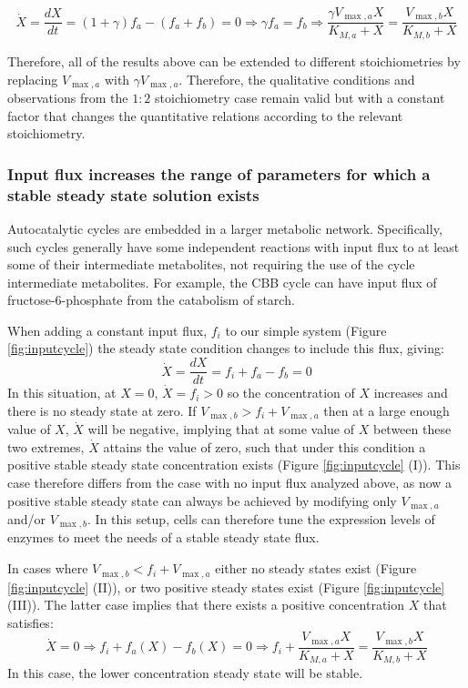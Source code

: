     \begin{equation*}
      \dot X = \frac{dX}{dt} = (1+\gamma)f_a - (f_a + f_b) = 0 \Rightarrow \gamma f_a = f_b \Rightarrow \frac{\gamma V_{\max,a}X}{K_{M,a}+X}=\frac{V_{\max,b}X}{K_{M,b}+X}
    \end{equation*}

    Therefore, all of the results above can be extended to different stoichiometries by replacing $V_{\max,a}$ with $\gamma V_{\max,a}$.
    Therefore, the qualitative conditions and observations from the $1:2$ stoichiometry case remain valid but with a constant factor that changes the quantitative relations according to the relevant stoichiometry.
\subsubsection{Input flux increases the range of parameters for which a stable steady state solution exists}
    Autocatalytic cycles are embedded in a larger metabolic network.
    Specifically, such cycles generally have some independent reactions with input flux to at least some of their intermediate metabolites, not requiring the use of the cycle intermediate metabolites.
    For example, the CBB cycle can have input flux of fructose-6-phosphate from the catabolism of starch.

    When adding a constant input flux, $f_i$ to our simple system (Figure \ref{fig:inputcycle}) the steady state condition changes to include this flux, giving:
    \begin{equation*}
      \dot X = \frac{dX}{dt} = f_i + f_a - f_b = 0
    \end{equation*}
    In this situation, at $X=0$, $\dot X=f_i>0$ so the concentration of $X$ increases and there is no steady state at zero.
    If $V_{\max,b}>f_i+V_{\max,a}$ then at a large enough value of $X$, $\dot X$ will be negative, implying that at some value of $X$ between these two extremes, $\dot{X}$ attains the value of zero, such that under this condition a positive stable steady state concentration exists (Figure \ref{fig:inputcycle} (I)).
    This case therefore differs from the case with no input flux analyzed above, as now a positive stable steady state can always be achieved by modifying only $V_{\max,a}$ and/or $V_{\max,b}$.
    In this setup, cells can therefore tune the expression levels of enzymes to meet the needs of a stable steady state flux.

    In cases where $V_{\max,b}<f_i+V_{\max,a}$ either no steady states exist (Figure \ref{fig:inputcycle} (II)), or two positive steady states exist (Figure \ref{fig:inputcycle} (III)).
    The latter case implies that there exists a positive concentration $X$ that satisfies:
    \begin{equation*}
        \dot X = 0 \Rightarrow f_i + f_a(X) - f_b(X) = 0 \Rightarrow f_i+\frac{V_{\max,a}X}{K_{M,a}+X} = \frac{V_{\max,b}X}{K_{M,b}+X}
    \end{equation*}
  In this case, the lower concentration steady state will be stable.


